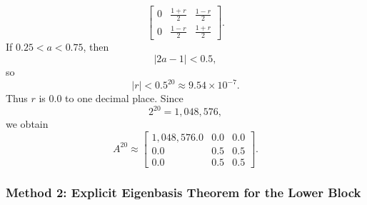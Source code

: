 \documentclass[12pt]{article}
\begin{document}
\begin{enumerate}[label=(\alph*)]
\[\begin{bmatrix}
  0&\frac{1+r}{2}&\frac{1-r}{2}\\
  0&\frac{1-r}{2}&\frac{1+r}{2}
  \end{bmatrix}.
  \]
  If $0.25<a<0.75$, then
  \[
  |2a-1|<0.5,
  \]
  so
  \[
  |r|<0.5^{20}\approx 9.54\times10^{-7}.
  \]
  Thus $r$ is $0.0$ to one decimal place. Since
  \[
  2^{20}=1{,}048{,}576,
  \]
  we obtain
  \[
  \boxed{
  A^{20}\approx
  \begin{bmatrix}
  1{,}048{,}576.0&0.0&0.0\\
  0.0&0.5&0.5\\
  0.0&0.5&0.5
  \end{bmatrix}.}
  \]
\end{enumerate}

\newpage
\subsubsection{Method 2: Explicit Eigenbasis Theorem for the Lower Block}
\end{document}
